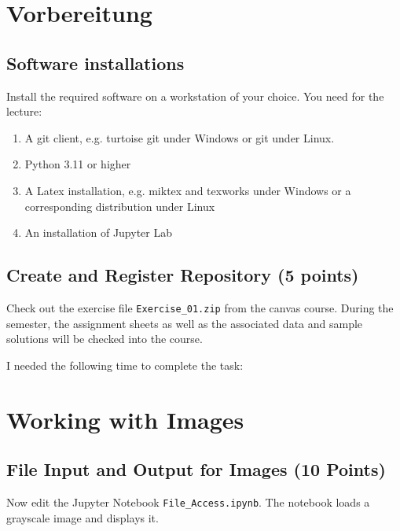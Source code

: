 \def\firstname{firstname}
\def\lastname{lastname}
\def\aufgabenblatt{1}




\thispagestyle{page1} 

\section{Vorbereitung}

\subsection{Software installations}

Install the required software on a workstation of your choice. You need for the lecture:

\begin{enumerate}
\item A git client, e.g. turtoise git under Windows or git under Linux.
\item Python 3.11 or higher 
\item A Latex installation, e.g. miktex and texworks under Windows or a corresponding distribution under Linux
\item An installation of Jupyter Lab
\end{enumerate}

\subsection{Create and Register Repository (5 points)}

Check out the exercise file \texttt{Exercise\_01.zip} from the canvas course. During the semester, the assignment sheets as well as the associated data and sample solutions will be checked into the course. 

I needed the following time to complete the task:

\section{Working with Images}

\subsection{File Input and Output for Images (10 Points)}

Now edit the Jupyter Notebook \texttt{File\_Access.ipynb}. The notebook loads a grayscale image and displays it.

